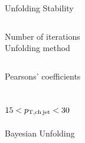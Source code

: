 \documentclass[xcolor={usenames,dvipsnames}]{beamer}
\begin{document}
\begin{frame}{Unfolding Stability}
\begin{columns}
\centering
\tiny 
Number of iterations\\
\centering
\tiny
Unfolding method\\
\end{columns}
\centering
\tiny
Pearsons' coefficients\\
\end{frame}

\subsection{$15<p_{\mathrm{T,ch\, jet}}<30$~\GeVc}

\begin{frame}{Bayesian Unfolding}
\begin{columns}
\centering
\centering
\end{columns}
\end{frame}
\end{document}
